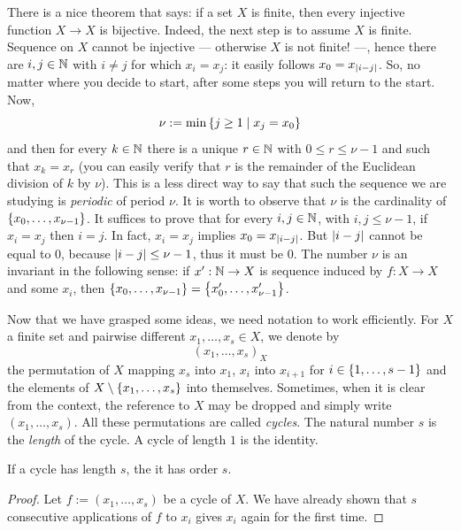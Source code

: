 There is a nice theorem that says: if a set \(X\) is finite, then every injective function \(X \to X\) is bijective. Indeed, the next step is to assume \(X\) is finite. Sequence on \(X\) cannot be injective --- otherwise \(X\) is not finite! ---, hence there are \(i, j \in \mathbb N\) with \(i \ne j\) for which \(x_i = x_j\): it easily follows \(x_0 = x_{\left\lvert i-j\right\rvert}\). So, no matter where you decide to start, after some steps you will return to the start. Now,
\[\nu := \min\left\{j \ge 1 \mid x_j = x_0\right\}\]
and then for every \(k \in \mathbb N\) there is a unique \(r \in \mathbb N\) with \(0 \le r \le \nu-1\) and such that \(x_k = x_r\) (you can easily verify that \(r\) is the remainder of the Euclidean division of \(k\) by \(\nu\)). This is a less direct way to say that such the sequence we are studying is {\em periodic} of period \(\nu\). It is worth to observe that \(\nu\) is the cardinality of \(\left\{x_0, \dots{}, x_{\nu-1}\right\}\). It suffices to prove that for every \(i, j \in \mathbb N\), with \(i, j \le \nu-1\), if \(x_i = x_j\) then \(i = j\). In fact, \(x_i = x_j\) implies \(x_0 = x_{\left\lvert i-j\right\rvert}\). But \(\left\lvert i-j\right\rvert\) cannot be equal to \(0\), because \(\left\lvert i-j\right\rvert \le \nu-1\), thus it must be \(0\). The number \(\nu\) is an invariant in the following sense: if \(x' : \mathbb N \to X\) is sequence induced by \(f : X \to X\) and some \(x_i\), then \(\left\{x_0, \dots{}, x_{\nu-1}\right\} = \left\{x'_0, \dots{}, x'_{\nu-1}\right\}\).

Now that we have grasped some ideas, we need notation to work efficiently. For \(X\) a finite set and pairwise different \(x_1, \dots{}, x_s \in X\), we denote by
\[\left( x_1, \dots{}, x_s \right)_X\]
the permutation of \(X\) mapping \(x_s\) into \(x_1\), \(x_i\) into \(x_{i+1}\) for \(i \in \left\{1, \dots{}, s-1\right\}\) and the elements of \(X \setminus \left\{x_1, \dots{}, x_s\right\}\) into themselves. Sometimes, when it is clear from the context, the reference to \(X\) may be dropped and simply write \(\left( x_1, \dots{}, x_s \right)\). All these permutations are called {\em cycles}. The natural number \(s\) is the {\em length} of the cycle. A cycle of length \(1\) is the identity.

\begin{proposition}
If a cycle has length \(s\), the it has order \(s\).
\end{proposition}

\begin{proof}
Let \(f := (x_1, \dots, x_s)\) be a cycle of \(X\). We have already shown that \(s\) consecutive applications of \(f\) to \(x_i\) gives \(x_i\) again for the first time.
\end{proof}

